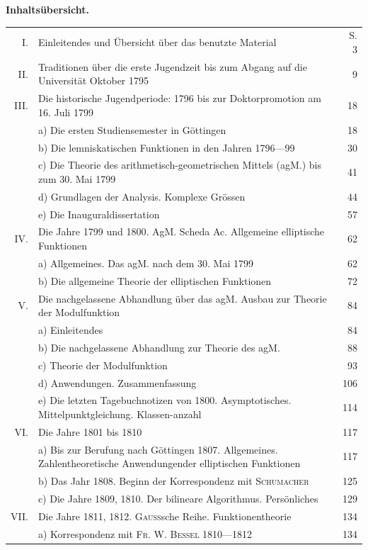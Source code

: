 \par\clearpage{}
\begin{center}\textbf{Inhaltsübersicht.}\end{center}
\begingroup
\fontsize{9}{12}\selectfont
\setlength{\tabcolsep}{3pt}
\newcommand{\TP}[1]{{\fontsize{8}{10}\selectfont\textls[350]{#1}}}
\newcommand{\CT}[4]{#1 & #2\ \TP{#3} & #4\\}
\noindent\begin{tabular}{@{}r p{.82\linewidth} r@{}}
\CT{I.}{Einleitendes und Übersicht über das benutzte Material}{..............}{S. 3}
\CT{II.}{Traditionen über die erste Jugendzeit bis zum Abgang auf die Universität Oktober 1795}{..}{9}
\CT{III.}{Die historische Jugendperiode: 1796 bis zur Doktorpromotion am 16. Juli 1799}{.....}{18}
\CT{}{a) Die ersten Studiensemester in Göttingen}{.................}{18}
\CT{}{b) Die lemniskatischen Funktionen in den Jahren 1796—99}{............}{30}
\CT{}{c) Die Theorie des arithmetisch-geometrischen Mittels (agM.) bis zum 30. Mai 1799}{...}{41}
\CT{}{d) Grundlagen der Analysis. Komplexe Grössen}{................}{44}
\CT{}{e) Die Inauguraldissertation}{.......................}{57}
\CT{IV.}{Die Jahre 1799 und 1800. AgM. Scheda Ac. Allgemeine elliptische Funktionen}{.....}{62}
\CT{}{a) Allgemeines. Das agM. nach dem 30. Mai 1799}{...............}{62}
\CT{}{b) Die allgemeine Theorie der elliptischen Funktionen}{.............}{72}
\CT{V.}{Die nachgelassene Abhandlung über das agM. Ausbau zur Theorie der Modulfunktion}{..}{84}
\CT{}{a) Einleitendes}{............................}{84}
\CT{}{b) Die nachgelassene Abhandlung zur Theorie des agM.}{.............}{88}
\CT{}{c) Theorie der Modulfunktion}{......................}{93}
\CT{}{d) Anwendungen. Zusammenfassung}{....................}{106}
\CT{}{e) Die letzten Tagebuchnotizen von 1800. Asymptotisches. Mittelpunktgleichung. Klassen-\newline anzahl}{..............................}{114}
\CT{VI.}{Die Jahre 1801 bis 1810}{.........................}{117}
\CT{}{a) Bis zur Berufung nach Göttingen 1807. Allgemeines. Zahlentheoretische Anwendungen\newline der elliptischen Funktionen}{......................}{117}
\CT{}{b) Das Jahr 1808. Beginn der Korrespondenz mit \textsc{Schumacher}}{..........}{125}
\CT{}{c) Die Jahre 1809, 1810. Der bilineare Algorithmus. Persönliches}{.........}{129}
\CT{VII.}{Die Jahre 1811, 1812. \textsc{Gauss}sche Reihe. Funktionentheorie}{............}{134}
\CT{}{a) Korrespondenz mit \textsc{Fr. W. Bessel} 1810—1812}{...............}{134}

\end{tabular}
